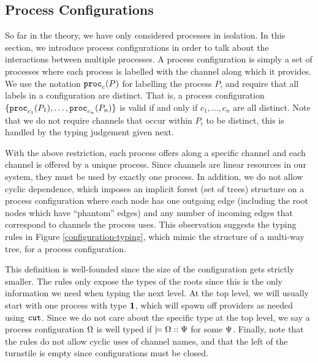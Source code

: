 \documentclass[a4paper,USenglish]{lipics-v2016}
\begin{document}
\subsection{Process Configurations}

So far in the theory, we have only considered processes in isolation. In this section, we introduce process configurations in order to talk about the interactions between multiple processes. A process configuration is simply a set of processes where each process is labelled with the channel along which it provides. We use the notation $\mathtt{proc}_{c}(P)$ for labelling the process $P$, and require that all labels in a configuration are distinct. That is, a process configuration $\lbrace\mathtt{proc}_{c_1}(P_1), \ldots, \mathtt{proc}_{c_n}(P_n)\rbrace$ is valid if and only if $c_1, \ldots, c_n$ are all distinct. Note that we do not require channels that occur within $P_i$ to be distinct, this is handled by the typing judgement given next.

With the above restriction, each process offers along a specific channel and each channel is offered by a unique process. Since channels are linear resources in our system, they must be used by exactly one process. In addition, we do not allow cyclic dependence, which imposes an implicit forest (set of trees) structure on a process configuration where each node has one outgoing edge (including the root nodes which have ``phantom'' edges) and any number of incoming edges that correspond to channels the process uses. This observation suggests the typing rules in Figure \ref{configuration-typing}, which mimic the structure of a multi-way tree, for a process configuration.


This definition is well-founded since the size of the configuration gets strictly smaller. The rules only expose the types of the roots since this is the only information we need when typing the next level. At the top level, we will usually start with one process with type $\mathbf{1}$, which will spawn off providers as needed using $\texttt{cut}$. Since we do not care about the specific type at the top level, we say a process configuration $\Omega$ is well typed if $\models {\Omega} :: {\Psi}$ for some $\Psi$. Finally, note that the rules do not allow cyclic uses of channel names, and that the left of the turnstile is empty since configurations must be closed.
\end{document}
